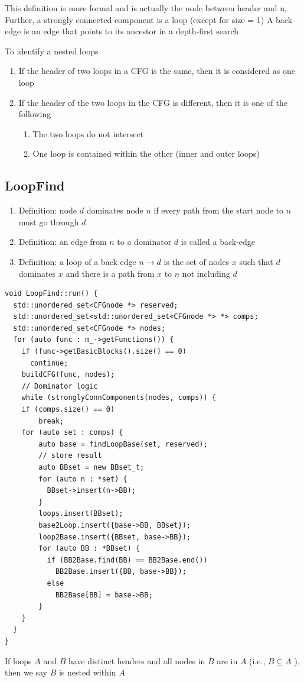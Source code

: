 \documentclass[a4paper]{article}
\theoremstyle{definition}
\begin{document}
This definition is more formal and is actually the node between header and n, Further, a strongly connected component is a loop (except for size = 1)
A back edge is an edge that points to its ancestor in a depth-first search

To identify a nested loops
\begin{enumerate}
    \item If the header of two loops in a CFG is the same, then it is considered as one loop

\item If the header of the two loops in the CFG is different, then it is one of the following
\begin{enumerate}
\item The two loops do not intersect
\item One loop is contained within the other (inner and outer loops)
\end{enumerate}
\end{enumerate}
\subsection{LoopFind}
\begin{enumerate}
    \item  Definition: node $d$ dominates node $n$ if every path from the start node to $n$ must go through $d$
\item Definition: an edge from $n$ to a dominator $d$ is called a back-edge
\item Definition: a loop of a back edge $n \rightarrow d$ is the set of nodes $x$ such that $d$ dominates $x$ and there is a path from $x$ to $n$ not including $d$
\end{enumerate}
\begin{verbatim}
void LoopFind::run() {
  std::unordered_set<CFGnode *> reserved;
  std::unordered_set<std::unordered_set<CFGnode *> *> comps;
  std::unordered_set<CFGnode *> nodes;
  for (auto func : m_->getFunctions()) {
    if (func->getBasicBlocks().size() == 0)
      continue;
    buildCFG(func, nodes);
    // Dominator logic
    while (stronglyConnComponents(nodes, comps)) {
    if (comps.size() == 0)
        break;
    for (auto set : comps) {
        auto base = findLoopBase(set, reserved);
        // store result
        auto BBset = new BBset_t;
        for (auto n : *set) {
          BBset->insert(n->BB);
        }
        loops.insert(BBset);
        base2Loop.insert({base->BB, BBset});
        loop2Base.insert({BBset, base->BB});
        for (auto BB : *BBset) {
          if (BB2Base.find(BB) == BB2Base.end())
            BB2Base.insert({BB, base->BB});
          else
            BB2Base[BB] = base->BB;
        }
    }
  }
}
\end{verbatim}
If loops $A$ and $B$ have distinct headers and all nodes in $B$ are in $A$ (i.e., $B \subseteq A$ ), then we say $B$ is nested within $A$
\end{document}
